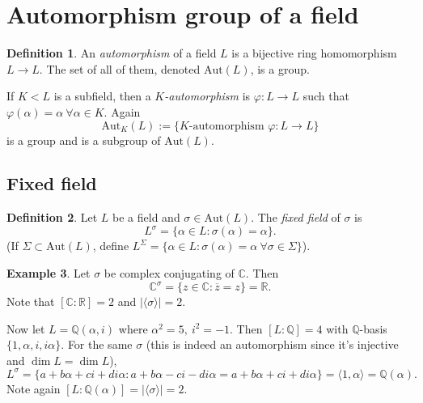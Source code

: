 \documentclass[a4paper]{article}
\newcommand{\Q}{\mathbb Q}
\newcommand{\C}{\mathbb C}
\newcommand{\R}{\mathbb R}
\newcommand{\Aut}{\text{Aut}}
\theoremstyle{definition}
\newtheorem{defn}{Definition}[subsection]
\newtheorem{example}[defn]{Example}
\begin{document}
\section{Automorphism group of a field}
\begin{defn}
An \textit{automorphism} of a field $L$ is a bijective ring homomorphism $L\rightarrow L$. The set of all of them, denoted $\Aut(L)$, is a group.

If $K<L$ is a subfield, then a $K$\textit{-automorphism} is $\varphi:L\rightarrow L$ such that $\varphi(\alpha)=\alpha \ \forall \alpha\in K$. Again
\[
\Aut_K(L):=\{K\text{-automorphism }\varphi:L\rightarrow L\}
\]
is a group and is a subgroup of $\Aut(L)$.
\end{defn}

\subsection{Fixed field}
\begin{defn}
Let $L$ be a field and $\sigma\in\Aut(L)$. The \textit{fixed field} of $\sigma$ is
\[
L^\sigma = \{\alpha\in L:\sigma(\alpha)=\alpha\}.
\]
(If $\Sigma\subset\Aut(L)$, define $L^\Sigma=\{\alpha\in L:\sigma(\alpha)=\alpha \ \forall \sigma\in\Sigma\}$).
\end{defn}

\begin{example}
Let $\sigma$ be complex conjugating of $\C$. Then
\[
\C^\sigma = \{z\in\C:\overline z=z\}=\R.
\]
Note that $[\C:\R]=2$ and $|\langle \sigma\rangle|=2$.

Now let $L=\Q(\alpha,i)$ where $\alpha^2=5,\ i^2=-1$. Then $[L:\Q]=4$ with $\Q$-basis $\{1,\alpha,i,i\alpha\}$. For the same $\sigma$ (this is indeed an automorphism since it's injective and $\dim L=\dim L$), 
\[
L^\sigma = \{a+b\alpha+ci+di\alpha:a+b\alpha-ci-di\alpha=a+b\alpha+ci+di\alpha\}=\langle 1,\alpha\rangle=\Q(\alpha).
\]
Note again $[L:\Q(\alpha)]=|\langle\sigma\rangle|=2$.
\end{example}
\end{document}
